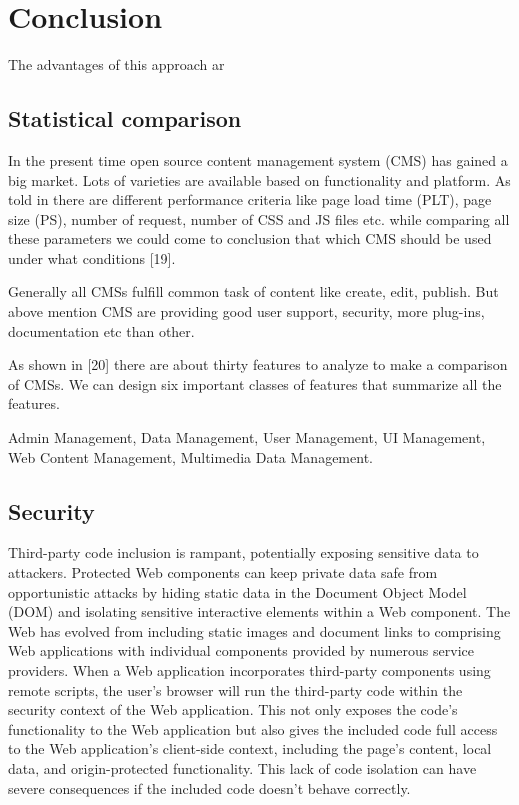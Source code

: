 \documentclass{sig-alternate}
\begin{document}
\section{Conclusion}

The advantages of this approach ar

\subsection{Statistical comparison}

In the present time open source content management system (CMS) has gained a big market. Lots of varieties are available based on functionality and platform.
As told in there are different performance criteria like page load time (PLT), page size (PS), number of request, number of CSS and JS files etc. while comparing all these parameters we could come to conclusion that which CMS should be used under what conditions [19].

Generally all CMSs fulfill common task of content like create, edit, publish. But above mention CMS are providing good user support, security, more plug-ins, documentation etc than other.
 
As shown in [20] there are about thirty features to analyze to make a comparison of CMSs. We can design six important classes of features that summarize all the features.

Admin Management, Data Management, User Management, UI Management, Web Content Management, Multimedia Data Management.

\subsection{Security}

Third-party code inclusion is rampant, potentially exposing sensitive data to attackers. Protected Web components can keep private data safe from opportunistic attacks by hiding static data in the Document Object Model (DOM) and isolating sensitive interactive elements within a Web component.
The Web has evolved from including static images and document links to comprising Web applications with individual components provided by numerous service providers. When a Web application incorporates third-party components using remote scripts, the user's browser will run the third-party code within the security context of the Web application. This not only exposes the code's functionality to the Web application but also gives the included code full access to the Web application's client-side context, including the page's content, local data, and origin-protected functionality. 
This lack of code isolation can have severe consequences if the included code doesn't behave correctly.
\end{document}

